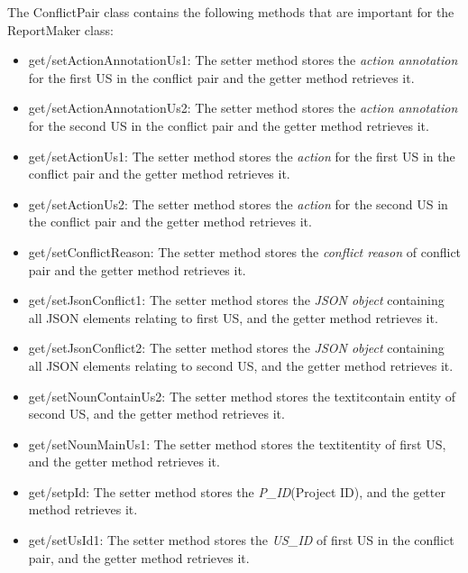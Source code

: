The ConflictPair class contains the following methods that are important for the ReportMaker class:
\begin{itemize}
	\item get/setActionAnnotationUs1: The setter method stores the \textit{action annotation} for the first US in the conflict pair and the getter method retrieves it.
	
	\item get/setActionAnnotationUs2: The setter method stores the \textit{action annotation} for the second US in the conflict pair and the getter method retrieves it.
	
	\item get/setActionUs1: The setter method stores the \textit{action} for the first US in the conflict pair and the getter method retrieves it.
	
	\item get/setActionUs2: The setter method stores the \textit{action} for the second US in the conflict pair and the getter method retrieves it.
		
	\item get/setConflictReason: The setter method stores the \textit{conflict reason} of conflict pair and the getter method retrieves it.
	
	\item get/setJsonConflict1: The setter method stores the \textit{JSON object} containing all JSON elements relating to first US, and the getter method retrieves it.
	
	\item get/setJsonConflict2: The setter method stores the \textit{JSON object} containing all JSON elements relating to second US, and the getter method retrieves it.
	
	\item get/setNounContainUs2: The setter method stores the textit{contain entity} of second US, and the getter method retrieves it.
	
	\item get/setNounMainUs1: The setter method stores the textit{entity} of first US, and the getter method retrieves it.
	
	\item get/setpId: The setter method stores the \textit{P\_ID}(Project ID), and the getter method retrieves it.
	
	\item get/setUsId1: The setter method stores the \textit{US\_ID} of first US in the conflict pair, and the getter method retrieves it.
	

\end{itemize}
